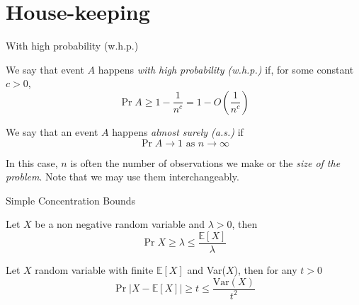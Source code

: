 \section{House-keeping}

\begin{frame}{With high probability (w.h.p.)}
    \begin{definition}
        We say that event $A$ happens \textit{with high probability (w.h.p.)} if, for some constant $c > 0$,
        $$ \Pr{A} \geq 1 - \frac{1}{n^c} = 1 - O\left(\frac{1}{n^c}\right)$$
    \end{definition}

    \begin{definition}
        We say that an event $A$ happens \textit{almost surely (a.s.)} if
        $$ \Pr{A} \to 1 \text{ as } n \to \infty$$
    \end{definition}

    In this case, $n$ is often the number of observations we make or the \textit{size of the problem}. Note that we may use them interchangeably.
\end{frame}

\begin{frame}{Simple Concentration Bounds}
    \begin{theorem}
        Let \(X\) be a non negative random variable and \(\lambda>0\), then
        \[
            \Pr{X \geq \lambda} \leq \frac{\mathbb{E}[X]}{\lambda}
        \]
    \end{theorem}
    \begin{theorem}
        Let $X$ random variable with finite $\mathbb{E}[X]$ and Var($X$), then for any $t > 0$
        \[
            \Pr{|X - \mathbb{E}[X]| \geq t} \leq \frac{\text{Var}(X)}{t^2}
        \]
    \end{theorem}
\end{frame}

